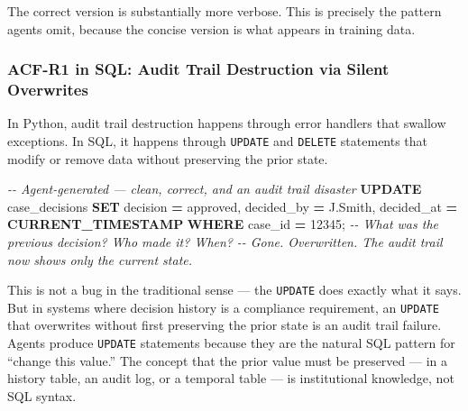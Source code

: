 \documentclass[a4paper,11pt]{report}
\newenvironment{Shaded}{\begin{snugshade}}{\end{snugshade}}
\newcommand{\CommentTok}[1]{\textcolor[rgb]{0.56,0.35,0.01}{\textit{#1}}}
\newcommand{\DecValTok}[1]{\textcolor[rgb]{0.00,0.00,0.81}{#1}}
\newcommand{\FunctionTok}[1]{\textcolor[rgb]{0.13,0.29,0.53}{\textbf{#1}}}
\newcommand{\KeywordTok}[1]{\textcolor[rgb]{0.13,0.29,0.53}{\textbf{#1}}}
\newcommand{\NormalTok}[1]{#1}
\newcommand{\OperatorTok}[1]{\textcolor[rgb]{0.81,0.36,0.00}{\textbf{#1}}}
\newcommand{\StringTok}[1]{\textcolor[rgb]{0.31,0.60,0.02}{#1}}
\begin{document}
The correct version is substantially more verbose. This is precisely the
pattern agents omit, because the concise version is what appears in
training data.

\hypertarget{acf-r1-in-sql-audit-trail-destruction-via-silent-overwrites}{%
\subsubsection{ACF-R1 in SQL: Audit Trail Destruction via Silent
Overwrites}\label{acf-r1-in-sql-audit-trail-destruction-via-silent-overwrites}}

In Python, audit trail destruction happens through error handlers that
swallow exceptions. In SQL, it happens through \texttt{UPDATE} and
\texttt{DELETE} statements that modify or remove data without preserving
the prior state.

\begin{Shaded}
\begin{Highlighting}[]
\CommentTok{{-}{-} Agent{-}generated — clean, correct, and an audit trail disaster}
\KeywordTok{UPDATE}\NormalTok{ case\_decisions}
\KeywordTok{SET}\NormalTok{ decision }\OperatorTok{=} \StringTok{\textquotesingle{}approved\textquotesingle{}}\NormalTok{, decided\_by }\OperatorTok{=} \StringTok{\textquotesingle{}J.Smith\textquotesingle{}}\NormalTok{, decided\_at }\OperatorTok{=} \FunctionTok{CURRENT\_TIMESTAMP}
\KeywordTok{WHERE}\NormalTok{ case\_id }\OperatorTok{=} \DecValTok{12345}\NormalTok{;}
\CommentTok{{-}{-} What was the previous decision? Who made it? When?}
\CommentTok{{-}{-} Gone. Overwritten. The audit trail now shows only the current state.}
\end{Highlighting}
\end{Shaded}

This is not a bug in the traditional sense --- the \texttt{UPDATE} does
exactly what it says. But in systems where decision history is a
compliance requirement, an \texttt{UPDATE} that overwrites without first
preserving the prior state is an audit trail failure. Agents produce
\texttt{UPDATE} statements because they are the natural SQL pattern for
``change this value.'' The concept that the prior value must be
preserved --- in a history table, an audit log, or a temporal table ---
is institutional knowledge, not SQL syntax.
\end{document}
